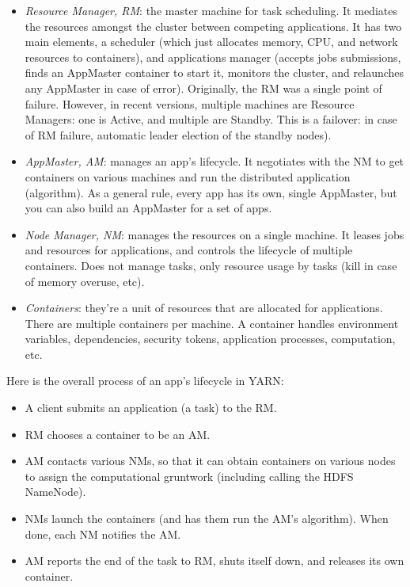 \documentclass{article}
\begin{document}
\begin{itemize}
\begin{itemize}
		\item \textit{Resource Manager, RM}: the master machine for task scheduling. It mediates the resources amongst the cluster between competing applications. It has two main elements, a scheduler (which just allocates memory, CPU, and network resources to containers), and applications manager (accepts jobs submissions, finds an AppMaster container to start it, monitors the cluster, and relaunches any AppMaster in case of error). Originally, the RM was a single point of failure. However, in recent versions, multiple machines are Resource Managers: one is Active, and multiple are Standby. This is a failover: in case of RM failure, automatic leader election of the standby nodes).

		\item \textit{AppMaster, AM}: manages an app's lifecycle. It negotiates with the NM to get containers on various machines and run the distributed application (algorithm). As a general rule, every app has its own, single AppMaster, but you can also build an AppMaster for a set of apps.

		\item \textit{Node Manager, NM}: manages the resources on a single machine. It leases jobs and resources for applications, and controls the lifecycle of multiple containers. Does not manage tasks, only resource usage by tasks (kill in case of memory overuse, etc).

		\item \textit{Containers}: they're a unit of resources that are allocated for applications. There are multiple containers per machine. A container handles environment variables, dependencies, security tokens, application processes, computation, etc.
	\end{itemize}

	Here is the overall process of an app's lifecycle in YARN:
	\begin{itemize}
		\item A client submits an application (a task) to the RM.
		\item RM chooses a container to be an AM.
		\item AM contacts various NMs, so that it can obtain containers on various nodes to assign the computational gruntwork (including calling the HDFS NameNode).
		\item NMs launch the containers (and has them run the AM's algorithm). When done, each NM notifies the AM.
		\item AM reports the end of the task to RM, shuts itself down, and releases its own container.
	\end{itemize}


\end{itemize}
\end{document}

